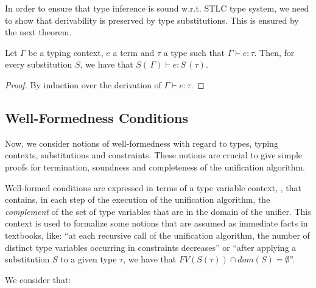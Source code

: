 In order to ensure that type inference is sound w.r.t. STLC type
system, we need to show that derivability is preserved by type
substitutions. This is ensured by the next theorem.

\begin{Theorem}
Let $\Gamma$ be a typing context, $e$ a term and $\tau$ a type such that
$\Gamma\vdash e : \tau$. Then, for every substitution $S$, we have that
$S(\,\Gamma) \vdash e : S\,(\tau)$.
\end{Theorem}\label{thm:substinfer}
\begin{proof}
   By induction over the derivation of $\Gamma\vdash e : \tau$.
\end{proof}


\subsection{Well-Formedness Conditions}

Now, we consider notions of well-formedness with regard to types,
typing contexts, substitutions and constraints. These notions are
crucial to give simple proofs for termination, soundness and
completeness of the unification algorithm.

Well-formed conditions are expressed in terms of a type variable
context, \V, that contains, in each step of the execution of the
unification algorithm, the {\em complement\/} of the set of type
variables that are in the domain of the unifier. This context is used
to formalize some notions that are assumed as immediate facts in
textbooks, like: ``at each recursive call of the unification
algorithm, the number of distinct type variables occurring in
constraints decreases'' or ``after applying a substitution $S$ to a
given type $\tau$, we have that $FV(S(\tau)) \cap dom(S) =
\emptyset$''.

We consider that:

